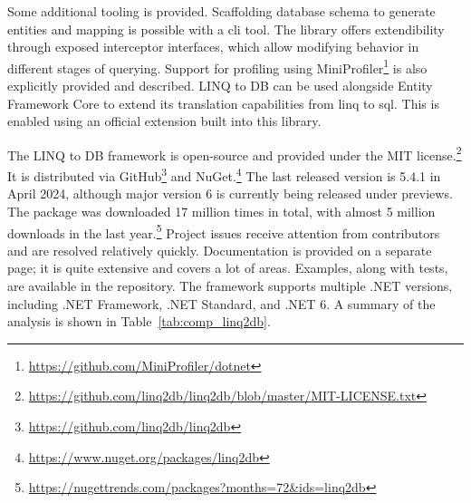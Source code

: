 Some additional tooling is provided. Scaffolding database schema to generate entities and mapping is possible with a \acrshort{cli} tool. The library offers extendibility through exposed interceptor interfaces, which allow modifying behavior in different stages of querying. Support for profiling using MiniProfiler\footnote{\url{https://github.com/MiniProfiler/dotnet}} is also explicitly provided and described.
LINQ to DB can be used alongside Entity Framework Core to extend its translation capabilities from \acrshort{linq} to \acrshort{sql}. This is enabled using an official extension built into this library.

The LINQ to DB framework is open-source and provided under the MIT license.\footnote{\url{https://github.com/linq2db/linq2db/blob/master/MIT-LICENSE.txt}} It is distributed via GitHub\footnote{\url{https://github.com/linq2db/linq2db}} and NuGet.\footnote{\url{https://www.nuget.org/packages/linq2db}} The last released version is 5.4.1 in April 2024, although major version 6 is currently being released under previews. The package was downloaded 17 million times in total, with almost 5 million downloads in the last year.\footnote{\url{https://nugettrends.com/packages?months=72&ids=linq2db}} Project issues receive attention from contributors and are resolved relatively quickly. Documentation is provided on a separate page; it is quite extensive and covers a lot of areas. Examples, along with tests, are available in the repository. The framework supports multiple .NET versions, including .NET Framework, .NET Standard, and .NET 6. A summary of the analysis is shown in Table~\ref{tab:comp_linq2db}.

